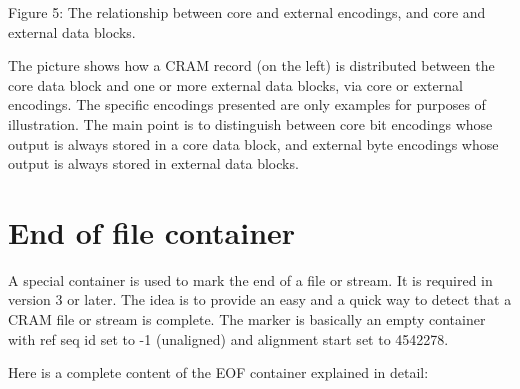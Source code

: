 \documentclass[a4paper]{article}
\begin{document}
\begin{center}

Figure 5: The relationship between core and external encodings, and core and external data blocks.

\end{center}

The picture shows how a CRAM record (on the left) is distributed between the core 
data block and one or more external data blocks, via core or external encodings. The specific 
encodings presented are only examples for purposes of illustration. The main point is 
to distinguish between core bit encodings whose output is always stored in a core data 
block, and external byte encodings whose output is always stored in external data 
blocks.

\section{\textbf{End of file container}}

A special container is used to mark the end of a file or stream. It is required in version 3 or later. The idea is to provide an easy and a quick way to detect that a CRAM file or stream is complete. The marker is basically an empty container with ref seq id set to -1 (unaligned) and alignment 
start set to 4542278.

Here is a complete content of the EOF container explained in detail:
\end{document}
